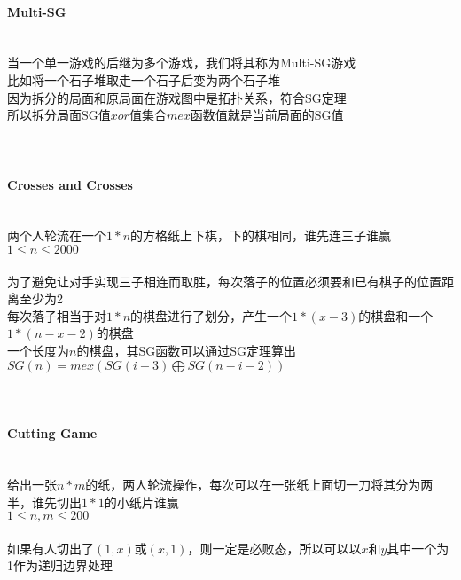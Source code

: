 \paragraph{Multi-SG}~{}
\\
当一个单一游戏的后继为多个游戏，我们将其称为Multi-SG游戏\\
比如将一个石子堆取走一个石子后变为两个石子堆\\
因为拆分的局面和原局面在游戏图中是拓扑关系，符合SG定理\\
所以拆分局面SG值$xor$值集合$mex$函数值就是当前局面的SG值\\
~\\
~\\
\paragraph{Crosses and Crosses}~{}
\\
两个人轮流在一个$1*n$的方格纸上下棋，下的棋相同，谁先连三子谁赢\\
$1 \leq n \leq 2000$\\
~\\
为了避免让对手实现三子相连而取胜，每次落子的位置必须要和已有棋子的位置距离至少为2\\
每次落子相当于对$1*n$的棋盘进行了划分，产生一个$1*(x-3)$的棋盘和一个$1*(n-x-2)$的棋盘\\
一个长度为$n$的棋盘，其SG函数可以通过SG定理算出$SG(n)=mex(SG(i-3) \bigoplus SG(n-i-2))$\\
~\\
~\\
\paragraph{Cutting Game}~{}
\\
给出一张$n*m$的纸，两人轮流操作，每次可以在一张纸上面切一刀将其分为两半，谁先切出$1*1$的小纸片谁赢\\
$1 \leq n,m \leq 200$\\
~\\
如果有人切出了$(1,x)$或$(x,1)$，则一定是必败态，所以可以以$x$和$y$其中一个为1作为递归边界处理\\